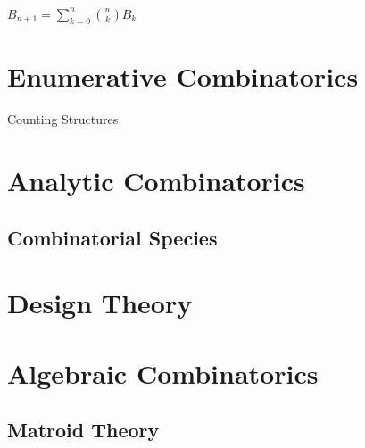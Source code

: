 $B_{n+1} = \sum_{k=0}^n \binom{n}{k} B_k$



\section{Enumerative Combinatorics}
\label{sec:enumerative_combinatorics}

Counting Structures



\section{Analytic Combinatorics}\label{sec:analytic_combinatorics}
\cite{flajolet-sedgewick09}

\subsection{Combinatorial Species}\label{sec:combinatorial_species}



\section{Design Theory}\label{sec:combinatorial_design}

\section{Algebraic Combinatorics}\label{sec:algebraic_combinatorics}

\subsection{Matroid Theory}\label{sec:matroid_theory}

